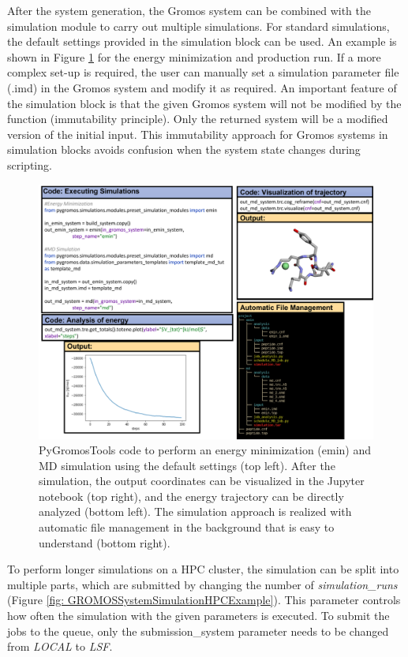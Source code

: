 After the system generation, the Gromos system can be combined with the simulation module to carry out multiple simulations. For standard simulations, the default settings provided in the simulation block can be used. An example is shown in Figure \ref{fig: GROMOSSystemSimulationExample} for the energy minimization and production run. If a more complex set-up is required, the user can manually set a simulation parameter file (.imd) in the Gromos system and modify it as required. An important feature of the simulation block is that the given Gromos system will not be modified by the function (immutability principle). Only the returned system will be a modified version of the initial input. This immutability approach for Gromos systems in simulation blocks avoids confusion when the system state changes during scripting. 

\begin{figure}[h!]
    \centering
    \includegraphics[width=\textwidth]{fig/ApplicationExamples/codeExample_GROMOSSystemSimulation.png}
    \caption{PyGromosTools code to perform an energy minimization (emin) and MD simulation using the default settings (top left). After the simulation, the output coordinates can be visualized in the Jupyter notebook (top right), and the energy trajectory can be directly analyzed (bottom left). The simulation approach is realized with automatic file management in the background that is easy to understand (bottom right).}
    \label{fig: GROMOSSystemSimulationExample}
\end{figure}


To perform longer simulations on a HPC cluster, the simulation can be split into multiple parts, which are submitted by changing the number of \textit{simulation\_runs} (Figure \ref{fig: GROMOSSystemSimulationHPCExample}). This parameter controls how often the simulation with the given parameters is executed. To submit the jobs to the queue, only the submission\_system parameter needs to be changed from \textit{LOCAL} to \textit{LSF}.

